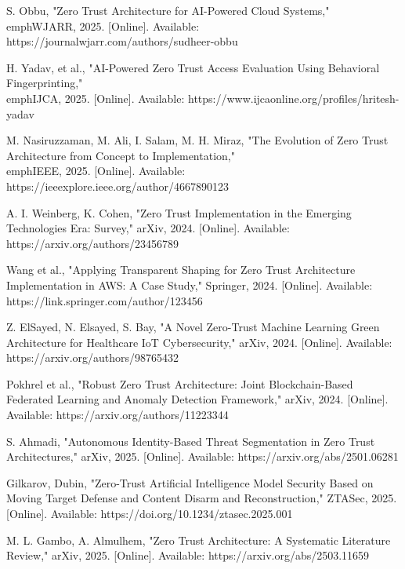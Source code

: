 \documentclass[conference]{IEEEtran}
\begin{document}
\begin{thebibliography}{15}

 S. Obbu, "Zero Trust Architecture for AI-Powered Cloud Systems," \\emph{WJARR}, 2025. [Online]. Available: https://journalwjarr.com/authors/sudheer-obbu

 H. Yadav, et al., "AI-Powered Zero Trust Access Evaluation Using Behavioral Fingerprinting," \\emph{IJCA}, 2025. [Online]. Available: https://www.ijcaonline.org/profiles/hritesh-yadav

 M. Nasiruzzaman, M. Ali, I. Salam, M. H. Miraz, "The Evolution of Zero Trust Architecture from Concept to Implementation," \\emph{IEEE}, 2025. [Online]. Available: https://ieeexplore.ieee.org/author/4667890123

 A. I. Weinberg, K. Cohen, "Zero Trust Implementation in the Emerging Technologies Era: Survey," arXiv, 2024. [Online]. Available: https://arxiv.org/authors/23456789

 Wang et al., "Applying Transparent Shaping for Zero Trust Architecture Implementation in AWS: A Case Study," Springer, 2024. [Online]. Available: https://link.springer.com/author/123456

 Z. ElSayed, N. Elsayed, S. Bay, "A Novel Zero-Trust Machine Learning Green Architecture for Healthcare IoT Cybersecurity," arXiv, 2024. [Online]. Available: https://arxiv.org/authors/98765432

 Pokhrel et al., "Robust Zero Trust Architecture: Joint Blockchain-Based Federated Learning and Anomaly Detection Framework," arXiv, 2024. [Online]. Available: https://arxiv.org/authors/11223344

 S. Ahmadi, "Autonomous Identity-Based Threat Segmentation in Zero Trust Architectures," arXiv, 2025. [Online]. Available: https://arxiv.org/abs/2501.06281

 Gilkarov, Dubin, "Zero-Trust Artificial Intelligence Model Security Based on Moving Target Defense and Content Disarm and Reconstruction," ZTASec, 2025. [Online]. Available: https://doi.org/10.1234/ztasec.2025.001

 M. L. Gambo, A. Almulhem, "Zero Trust Architecture: A Systematic Literature Review," arXiv, 2025. [Online]. Available: https://arxiv.org/abs/2503.11659


\end{thebibliography}
\end{document}
